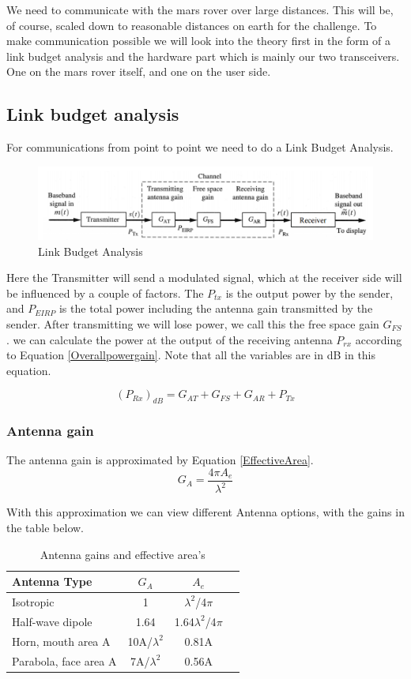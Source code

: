 \documentclass[10pt,a4paper]{article}
\begin{document}
We need to communicate with the mars rover over large distances. This will be, of course, scaled down to reasonable distances on earth for the challenge. To make communication possible we will look into the theory first in the form of a link budget analysis and the hardware part which is mainly our two transceivers. One on the mars rover itself, and one on the user side.

\subsection{Link budget analysis}
For communications from point to point we need to do a Link Budget Analysis.

\begin{figure}[!h]
    \centering
    \includegraphics[scale=0.6]{figures/LinkBudget.png}
    \caption{Link Budget Analysis}
\end{figure}

Here the Transmitter will send a modulated signal, which at the receiver side will be influenced by a couple of factors. The $P_{tx}$ is the output power by the sender, and $P_{EIRP}$ is the total power including the antenna gain transmitted by the sender. After transmitting we will lose power, we call this the free space gain $G_{FS}$. we can calculate the power at the output of the receiving antenna $P_{rx}$ according to Equation \ref{Overallpowergain}. Note that all the variables are in dB in this equation.

\begin{equation}
\label{Overallpowergain}
(P_{Rx})_{dB} = G_{AT} + G_{FS} + G_{AR} + P_{Tx}
\end{equation}
\subsubsection{Antenna gain}
The antenna gain is approximated by Equation \ref{EffectiveArea}.
\begin{equation}
\label{EffectiveArea}
G_{A} = \frac{4 \pi A_e}{\lambda^2}
\end{equation}

With this approximation we can view different Antenna options, with the gains in the table below.
\begin{table}[!h]
\caption {Antenna gains and effective area's}
\center 
\begin{tabular}{l*{2}{c}r}
Antenna Type      & $G_A$ & $A_e$ \\
\hline
Isotropic 				& 1 & $\lambda^2$/4$\pi$ \\
Half-wave dipole        & 1.64 & 1.64$\lambda^2$/4$\pi$ \\
Horn, mouth area A      & 10A/$\lambda^2$ & 0.81A \\
Parabola, face area A   & 7A/$\lambda^2$ & 0.56A \\
\end{tabular}
\end{table}
\end{document}
